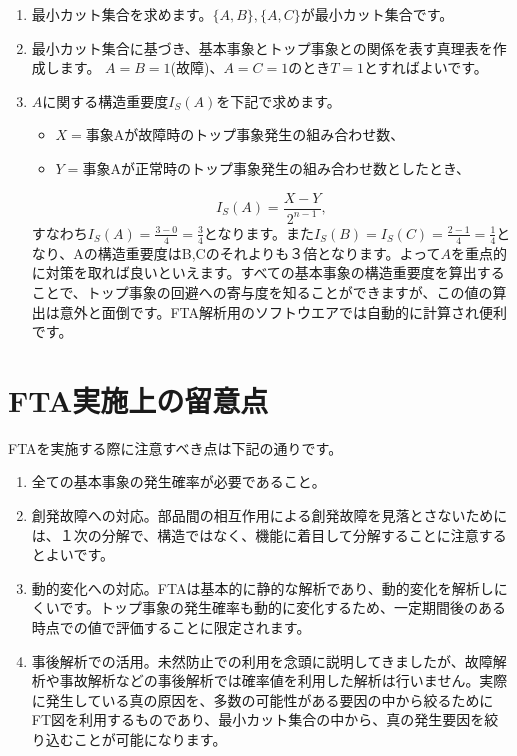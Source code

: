 \begin{enumerate}
\item 最小カット集合を求めます。$\{A,B\},\{A,C\}$が最小カット集合です。
\item 最小カット集合に基づき、基本事象とトップ事象との関係を表す真理表を作成します。
$A=B=1$(故障)、$A=C=1$のとき$T=1$とすればよいです。
\item $A$に関する構造重要度$I_S(A)$を下記で求めます。
\begin{itemize}
\item $X=$事象Aが故障時のトップ事象発生の組み合わせ数、
\item $Y=$事象Aが正常時のトップ事象発生の組み合わせ数としたとき、
\end{itemize}
\[I_S(A) = \frac{X-Y}{2^{n-1}},\]
すなわち$I_S(A)=\frac{3-0}{4}=\frac{3}{4}$となります。また$I_S(B)=I_S(C)=\frac{2-1}{4}=\frac{1}{4}$となり、Aの構造重要度はB,Cのそれよりも３倍となります。よって$A$を重点的に対策を取れば良いといえます。すべての基本事象の構造重要度を算出することで、トップ事象の回避への寄与度を知ることができますが、この値の算出は意外と面倒です。FTA解析用のソフトウエアでは自動的に計算され便利です。
\end{enumerate}
\section{FTA実施上の留意点}
FTAを実施する際に注意すべき点は下記の通りです。
\begin{enumerate}
\item 全ての基本事象の発生確率が必要であること。
\item 創発故障への対応。部品間の相互作用による創発故障を見落とさないためには、１次の分解で、構造ではなく、機能に着目して分解することに注意するとよいです。
\item 動的変化への対応。FTAは基本的に静的な解析であり、動的変化を解析しにくいです。トップ事象の発生確率も動的に変化するため、一定期間後のある時点での値で評価することに限定されます。
\item 事後解析での活用。未然防止での利用を念頭に説明してきましたが、故障解析や事故解析などの事後解析では確率値を利用した解析は行いません。実際に発生している真の原因を、多数の可能性がある要因の中から絞るためにFT図を利用するものであり、最小カット集合の中から、真の発生要因を絞り込むことが可能になります。
\end{enumerate}




